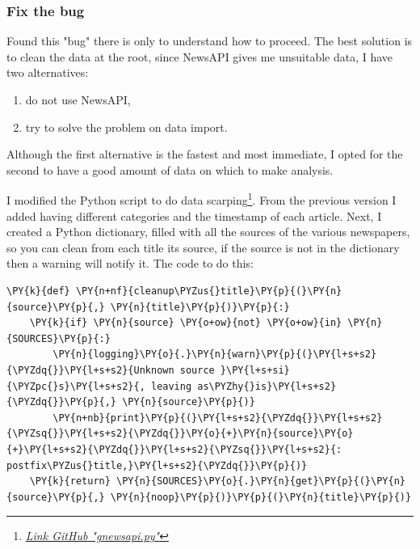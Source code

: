 \subsubsection{Fix the bug}
Found this "bug" there is only to understand how to proceed.
The best solution is to clean the data at the root, since NewsAPI gives me unsuitable data, I have two alternatives:
\begin{enumerate}
    \item do not use NewsAPI,
    \item try to solve the problem on data import.
\end{enumerate}

Although the first alternative is the fastest and most immediate, I opted for the second to have a good amount of data on which to make analysis.

I modified the Python script to do data scarping\footnote{\href{https://github.com/bak89/Sentiment-Analysis-on-Swiss-Newspapers/blob/main/Project\%20source/database_newspaper/gnewsapi.py}{\emph{Link GitHub "gnewsapi.py"}}}.
From the previous version I added having different categories and the timestamp of each article.
Next, I created a Python dictionary, filled with all the sources of the various newspapers, so you can clean from each title its source, if the source is not in the dictionary then a warning will notify it.
The code to do this:
\begin{tcolorbox}[breakable, size=fbox, boxrule=1pt, pad at break*=1mm,colback=cellbackground, colframe=cellborder]
\begin{Verbatim}[commandchars=\\\{\},fontsize=\footnotesize]
\PY{k}{def} \PY{n+nf}{cleanup\PYZus{}title}\PY{p}{(}\PY{n}{source}\PY{p}{,} \PY{n}{title}\PY{p}{)}\PY{p}{:}
    \PY{k}{if} \PY{n}{source} \PY{o+ow}{not} \PY{o+ow}{in} \PY{n}{SOURCES}\PY{p}{:}
        \PY{n}{logging}\PY{o}{.}\PY{n}{warn}\PY{p}{(}\PY{l+s+s2}{\PYZdq{}}\PY{l+s+s2}{Unknown source }\PY{l+s+si}{\PYZpc{}s}\PY{l+s+s2}{, leaving as\PYZhy{}is}\PY{l+s+s2}{\PYZdq{}}\PY{p}{,} \PY{n}{source}\PY{p}{)}
        \PY{n+nb}{print}\PY{p}{(}\PY{l+s+s2}{\PYZdq{}}\PY{l+s+s2}{\PYZsq{}}\PY{l+s+s2}{\PYZdq{}}\PY{o}{+}\PY{n}{source}\PY{o}{+}\PY{l+s+s2}{\PYZdq{}}\PY{l+s+s2}{\PYZsq{}}\PY{l+s+s2}{: postfix\PYZus{}title,}\PY{l+s+s2}{\PYZdq{}}\PY{p}{)}
    \PY{k}{return} \PY{n}{SOURCES}\PY{o}{.}\PY{n}{get}\PY{p}{(}\PY{n}{source}\PY{p}{,} \PY{n}{noop}\PY{p}{)}\PY{p}{(}\PY{n}{title}\PY{p}{)}
\end{Verbatim}
\end{tcolorbox}

